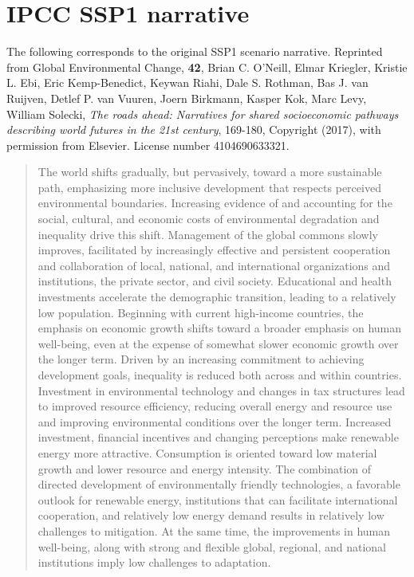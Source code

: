 \clearpage
\chapter{IPCC SSP1 narrative}
\label{a:ssp1-original-narrative}

The following corresponds to the original SSP1 scenario narrative. Reprinted from Global Environmental Change, \textbf{42}, Brian C. O’Neill, Elmar Kriegler, Kristie L. Ebi, Eric Kemp-Benedict, Keywan Riahi, Dale S. Rothman, Bas J. van Ruijven, Detlef P. van Vuuren, Joern Birkmann, Kasper Kok, Marc
Levy, William Solecki, \textit{The roads ahead: Narratives for shared socioeconomic pathways describing world futures in the 21st century}, 169-180, Copyright (2017), with permission from Elsevier. License number 4104690633321.
%
\blockquote{\small
The world shifts gradually, but pervasively, toward a more sustainable path, emphasizing more inclusive development that respects perceived environmental boundaries. Increasing evidence of and accounting for the social, cultural, and economic costs of environmental degradation and inequality drive this shift. Management of the global commons slowly improves, facilitated by increasingly effective and persistent cooperation and collaboration of local, national, and international organizations and institutions, the private sector, and civil society. Educational and health investments accelerate the demographic transition, leading to a relatively low population. Beginning with current high-income countries, the emphasis on economic growth shifts toward a broader emphasis on human well-being, even at the expense of somewhat slower economic growth over the longer term. Driven by an increasing commitment to achieving development goals, inequality is reduced both across and within countries. Investment in environmental technology and changes in tax structures lead to improved resource efficiency, reducing overall energy and resource use and improving environmental conditions over the longer term. Increased investment, financial incentives and changing perceptions make renewable energy more attractive. Consumption is oriented toward low material growth and lower resource and energy intensity. The combination of directed development of environmentally friendly technologies, a favorable outlook for renewable energy, institutions that can facilitate international cooperation, and relatively low energy demand results in relatively low challenges to mitigation. At the same time, the improvements in human well-being, along with strong and flexible global, regional, and national institutions imply low challenges to adaptation.
}